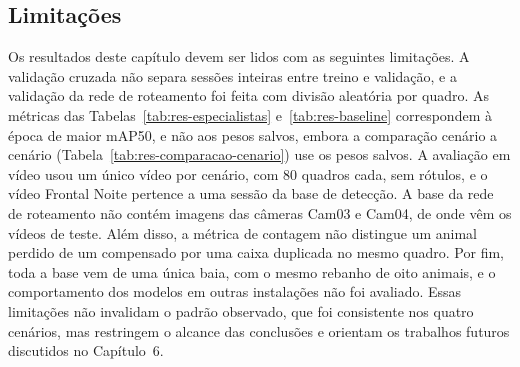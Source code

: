 \subsection{Limitações}
\label{subsec:disc-limitacoes}

Os resultados deste capítulo devem ser lidos com as seguintes limitações. A validação cruzada não separa sessões inteiras entre treino e validação, e a validação da rede de roteamento foi feita com divisão aleatória por quadro. As métricas das Tabelas~\ref{tab:res-especialistas} e~\ref{tab:res-baseline} correspondem à época de maior mAP50, e não aos pesos salvos, embora a comparação cenário a cenário (Tabela~\ref{tab:res-comparacao-cenario}) use os pesos salvos. A avaliação em vídeo usou um único vídeo por cenário, com 80 quadros cada, sem rótulos, e o vídeo Frontal Noite pertence a uma sessão da base de detecção. A base da rede de roteamento não contém imagens das câmeras Cam03 e Cam04, de onde vêm os vídeos de teste. Além disso, a métrica de contagem não distingue um animal perdido de um compensado por uma caixa duplicada no mesmo quadro. Por fim, toda a base vem de uma única baia, com o mesmo rebanho de oito animais, e o comportamento dos modelos em outras instalações não foi avaliado. Essas limitações não invalidam o padrão observado, que foi consistente nos quatro cenários, mas restringem o alcance das conclusões e orientam os trabalhos futuros discutidos no Capítulo~6.
